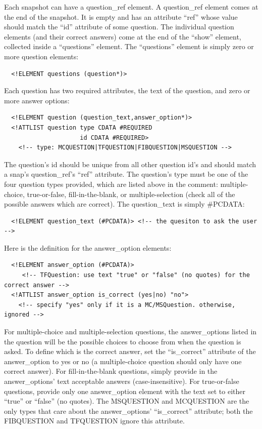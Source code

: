 \documentclass[11pt,letterpaper]{book}
\begin{document}
Each snapshot can have a question\_ref element. A question\_ref
element comes at the end of the snapshot. It is empty and has an
attribute ``ref'' whose value should match the ``id'' attribute of
some question. The individual question elements (and their correct
answers) come at the end of the ``show'' element, collected inside a
``questions'' element. The ``questions'' element is simply zero or
more question elements:


\footnotesize \begin{verbatim}
  <!ELEMENT questions (question*)>
\end{verbatim} \normalsize

Each question has two required attributes, the text of the question, and zero or more answer options:

\footnotesize \begin{verbatim}
  <!ELEMENT question (question_text,answer_option*)>
  <!ATTLIST question type CDATA #REQUIRED
                     id CDATA #REQUIRED>
    <!-- type: MCQUESTION|TFQUESTION|FIBQUESTION|MSQUESTION -->
\end{verbatim} \normalsize
  
  The question's id should be unique from all other question id's and
  should match a snap's question\_ref's ``ref'' attribute. The
  question's type must be one of the four question types provided,
  which are listed above in the comment: multiple-choice,
  true-or-false, fill-in-the-blank, or multiple-selection (check all
  of the possible answers which are correct). The question\_text is
  simply \#PCDATA:

\footnotesize \begin{verbatim}
  <!ELEMENT question_text (#PCDATA)> <!-- the quesiton to ask the user -->
\end{verbatim} \normalsize

Here is the definition for the answer\_option elements:

\footnotesize \begin{verbatim}
  <!ELEMENT answer_option (#PCDATA)>
     <!-- TFQuestion: use text "true" or "false" (no quotes) for the correct answer -->
  <!ATTLIST answer_option is_correct (yes|no) "no">
    <!-- specify "yes" only if it is a MC/MSQuestion. otherwise, ignored -->
\end{verbatim} \normalsize

For multiple-choice and multiple-selection questions, the
answer\_options listed in the question will be the possible choices to
choose from when the question is asked. To define which is the correct
answer, set the ``is\_correct'' attribute of the answer\_option to yes
or no (a multiple-choice question should only have one correct
answer). For fill-in-the-blank questions, simply provide in the
answer\_options' text acceptable answers (case-insensitive). For
true-or-false questions, provide only one answer\_option element with
the text set to either ``true'' or ``false'' (no quotes). The
MSQUESTION and MCQUESTION are the only types that care about the
answer\_options' ``is\_correct'' attribute; both the FIBQUESTION and
TFQUESTION ignore this attribute.
\end{document}
